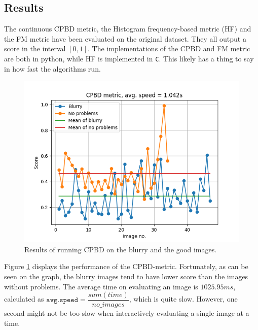 \subsection{Results}
The continuous CPBD metric\cite{CPBD}, the Histogram frequency-based metric (HF) and the FM metric have been evaluated on the original dataset. They all output a score in the interval $[0,1]$. The implementations of the CPBD and FM metric are both in python, while HF is implemented in \texttt{C}. This likely has a thing to say in how fast the algorithms run.

\begin{figure}[H]
    \centering
    \includegraphics[width=.8\textwidth]{Figures/BlurredImages/output_cpbd.png}
    \caption{Results of running CPBD on the blurry and the good images.}
    \label{fig:cpbd}
\end{figure}
Figure \ref{fig:cpbd} displays the performance of the CPBD-metric. Fortunately, as can be seen on the graph, the blurry images tend to have lower score than the images without problems. The average time on evaluating an image is $1025.95\si{ms}$, calculated as $\texttt{avg.speed}=\dfrac{sum(time)}{no\_images}$, which is quite slow. However, one second might not be too slow when interactively evaluating a single image at a time.

